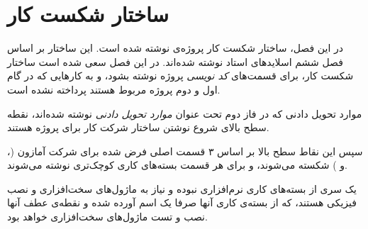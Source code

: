 \chapter{ساختار شکست کار}
در این فصل، ساختار شکست کار پروژه‌ی
نوشته شده است. این ساختار بر اساس فصل ششم اسلاید‌های استاد نوشته شده‌اند. در این فصل سعی شده است ساختار شکست کار، برای قسمت‌های \textit{کد نویسی} پروژه نوشته بشود، و به کارهایی که در گام اول و دوم پروژه مربوط هستند پرداخته نشده ‌است.

موارد تحویل دادنی که در فاز دوم تحت عنوان \textit{موارد تحویل دادنی} نوشته شده‌اند، نقطه سطح بالای شروع نوشتن ساختار شرکت کار برای پروژه 
هستند.

سپس این نقاط سطح بالا بر اساس ۳ قسمت اصلی فرض شده برای شرکت آمازون (،  و ) شکسته می‌شوند، و برای هر قسمت بسته‌های کاری کوچک‌تری نوشته می‌شوند.

یک سری از بسته‌های کاری نرم‌افزاری نبوده و نیاز به ماژول‌های سخت‌افزاری و نصب فیزیکی هستند، که از بسته‌ی کاری آنها صرفا یک اسم آورده شده و نقطه‌ی عطف آنها نصب و تست ماژول‌‌های سخت‌افزاری خواهد بود.



